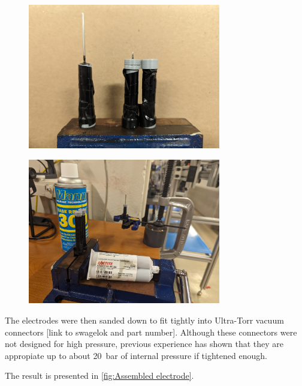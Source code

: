                 \begin{figure}[h]
                    \centering
                    \includegraphics[width=0.75\textwidth]{assets/3 design/Molds.jpg}
                \end{figure}



                \begin{figure}[h]
                    \centering
                    \includegraphics[width=0.75\textwidth]{assets/3 design/Mold process.jpg}
                \end{figure}

                The electrodes were then sanded down to fit tightly into Ultra-Torr vacuum connectors [link to swagelok and part number]. Although these connectors were not designed for high pressure, previous experience has shown that they are appropiate up to about \qty{20}{bar} of internal pressure if tightened enough.

                The result is presented in \autoref{fig:Assembled electrode}.


